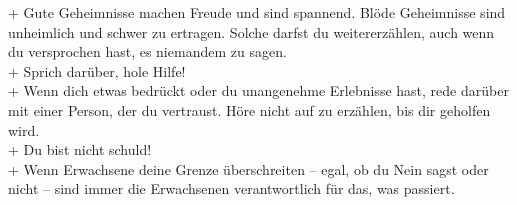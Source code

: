 + Gute Geheimnisse machen Freude und sind spannend. Blöde Geheimnisse sind
\noindent\hspace*{2mm} unheimlich und schwer zu ertragen. Solche darfst du weitererzählen, auch wenn
\noindent\hspace*{2mm} du versprochen hast, es niemandem zu sagen. \\[5pt]
+ Sprich darüber, hole Hilfe! \\[5pt]
+ Wenn dich etwas bedrückt oder du unangenehme Erlebnisse hast, rede darüber
\noindent\hspace*{2mm} mit einer Person, der du vertraust. Höre nicht auf zu erzählen, bis dir geholfen wird. \\[5pt]
+ Du bist nicht schuld! \\[5pt]
+ Wenn Erwachsene deine Grenze überschreiten – egal, ob du Nein sagst oder nicht
\noindent\hspace*{2mm} – sind immer die Erwachsenen verantwortlich für das, was passiert.